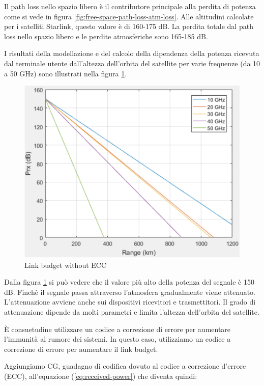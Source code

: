Il path loss nello spazio libero è il contributore principale alla perdita di potenza come si vede in figura \ref{fig:free-space-path-loss-atm-loss}.
Alle altitudini calcolate per i satelliti Starlink, questo valore è di 160-175 dB.
La perdita totale dal path loss nello spazio libero e le perdite atmosferiche sono 165-185 dB.

I risultati della modellazione e del calcolo della dipendenza della potenza ricevuta dal terminale utente dall'altezza dell'orbita del satellite per varie frequenze (da 10 a 50 GHz) sono illustrati nella figura \ref{fig:link-budget-wo-ecc}.

\begin{figure}[htbp]
  \centering
  \includegraphics[width=0.8\linewidth]{./res/img/link_budget_wo_ecc.png}
  \caption{Link budget without \ac{ECC}}
  \label{fig:link-budget-wo-ecc}
\end{figure}

Dalla figura \ref{fig:link-budget-wo-ecc} si può vedere che il valore più alto della potenza del segnale è 150 dB.
Finchè il segnale passa attraverso l'atmosfera gradualmente viene attenuato.
L'attenuazione avviene anche sui dispositivi ricevitori e trasmettitori.
Il grado di attenuazione dipende da molti parametri e limita l'altezza dell'orbita del satellite.

È consuetudine utilizzare un codice a correzione di errore per aumentare l'immunità al rumore dei sistemi.
In questo caso, utilizziamo un codice a correzione di errore per aumentare il link budget.

Aggiungiamo CG, guadagno di codifica dovuto al codice a correzione d'errore (\ac{ECC}), all'equazione (\ref{eq:received-power}) che diventa quindi:

